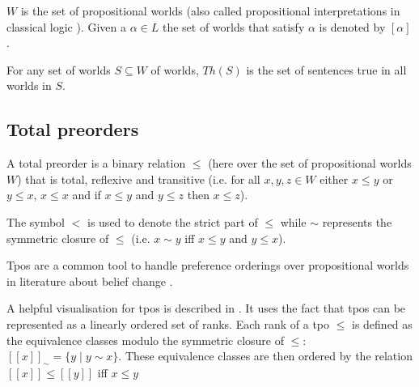 \documentclass[english, 12pt]{scrartcl}
\theoremstyle{definition}
\theoremstyle{definition}
\theoremstyle{definition}
\begin{document}
$W$ is the set of propositional worlds (also called propositional interpretations in classical logic \cite{Kai2020}). Given a $\alpha \in L$ the set of worlds that satisfy $\alpha$ is denoted by $[\alpha]$.

For any set of worlds $S \subseteq W$ of worlds, $Th(S)$ is the set of sentences true in all worlds in $S$.

\subsection{Total preorders}
A total preorder is a binary relation $\leq$ (here over the set of propositional worlds $W$) that is total, reflexive and transitive (i.e. for all $x, y, z \in W$ either $x \leq y$ or $y \leq x$, $x \leq x$ and if $x \leq y$ and $y \leq z$ then $x \leq z$).

The symbol $<$ is used to denote the strict part of $\leq$ while $\sim$ represents the symmetric closure of $\leq$ (i.e. $x \sim y$ iff $x \leq y$ and $y \leq x$).

Tpos are a common tool to handle preference orderings over propositional worlds in literature about belief change \cite{Booth2011}.

A helpful visualisation for tpos is described in \cite{Booth2006}. It uses the fact that tpos can be represented as a linearly ordered set of ranks. Each rank of a tpo $\leq$ is defined as the equivalence classes modulo the symmetric closure of $\leq$: $[[x]]_{\sim} = \{y \mid y \sim x\}$. These equivalence classes are then ordered by the relation $[[x]] \leq [[y]]$ iff $x \leq y$
\end{document}
